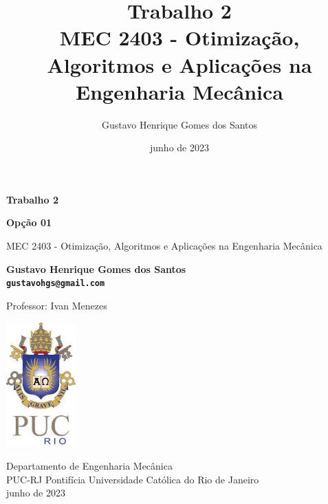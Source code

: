 \documentclass[10pt, a4paper]{article}
\begin{document}
\def\TITLE{Trabalho 2}
\def\SUBTITLE{Opção 01}
\def\DISCIPLINE{MEC 2403 - Otimização, Algoritmos e Aplicações na Engenharia Mecânica}
\def\PROFESSOR{Ivan Menezes}
\def\AUTHOR{Gustavo Henrique Gomes dos Santos}
\def\CONTACT{gustavohgs@gmail.com}
\def\DATE{junho de 2023}

\title{\textbf{\TITLE} \\ \DISCIPLINE}
\author{\AUTHOR}
\date{\DATE}

\begin{titlepage}
      \begin{center}
          \vspace*{1cm}

          \Huge
          \textbf{\TITLE}

          \Large
          \textbf{\SUBTITLE}

          \vspace{0.5cm}
          \LARGE
          \DISCIPLINE

          \vspace{1.5cm}

          \textbf{\AUTHOR \\ {\tt \CONTACT}}

          \vfill
          Professor: \PROFESSOR

          \vspace{0.8cm}

          \includegraphics[width=0.2\textwidth]{../general/puc.jpg}

          \Large
          Departamento de Engenharia Mecânica\\
          PUC-RJ Pontifícia Universidade Católica do Rio de Janeiro\\
          \DATE

      \end{center}
  \end{titlepage}

\maketitle
\end{document}
